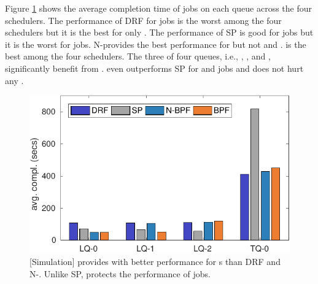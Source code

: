Figure \ref{fig:avg_multi_queue} shows the average completion time of jobs on each queue across the four schedulers.
The performance of DRF for \burstq jobs is the worst among the four schedulers but it is the best for only .
The performance of SP is good for \burstq jobs but it is the worst for \batchq jobs.
N-\name provides the best performance for  but not  and .
\name is the best among the four schedulers.
The three of four queues, i.e., , , and , significantly benefit from \name.
\name even outperforms SP for  and  jobs and does not hurt any {\batchq}.

\begin{figure}[!h]
    \centering
    \includegraphics[width=0.8\linewidth]{fig/avg_multi_queuesadmit}
    \caption{[Simulation] \name provides with better performance for {\burstq}s than DRF and N-\name. Unlike SP, \name protects the performance of \batchq jobs.}
    \label{fig:avg_multi_queue}
\end{figure}
